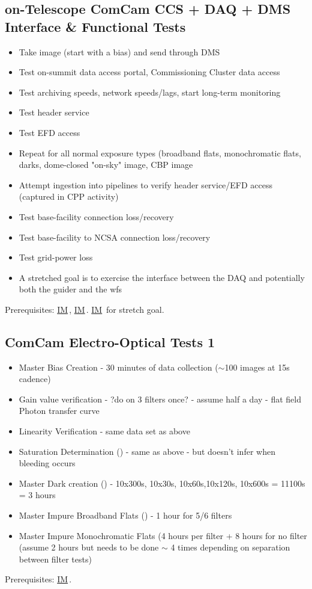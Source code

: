 \documentclass[SE,authoryear,toc]{lsstdoc}
\newcommand{\IM}[1]{\hyperref[IM:#1]{\color{blue}IM$_{\text{\csname nameIM#1\endcsname}}$}\gdef\thisIM{#1}}
\begin{document}
\subsection{on-Telescope ComCam CCS + DAQ + DMS Interface \& Functional Tests}
\begin{itemize}
\item Take image (start with a bias) and send through DMS
\item Test on-summit data access portal, Commissioning Cluster data access
\item Test archiving speeds, network speeds/lags, start long-term monitoring
\item Test header service
\item Test EFD access
\item Repeat for all normal exposure types (broadband flats, monochromatic flats, darks, dome-closed "on-sky" image, CBP image
\item Attempt ingestion into pipelines to verify header service/EFD access (captured in CPP activity)
\item Test base-facility connection loss/recovery
\item Test base-facility to NCSA connection loss/recovery
\item Test grid-power loss
\item A stretched goal is to exercise the interface between the DAQ and potentially both the guider and the wfs
\end{itemize}
Prerequisites: \IM{b}, \IM{cbp}.  \IM{g} for stretch goal.

\subsection{ComCam Electro-Optical Tests 1}

\begin{itemize}
\item Master Bias Creation - 30 minutes of data collection ($\sim$100 images at 15s cadence)
\item Gain value verification - ?do on 3 filters once? - assume half a day - flat field Photon transfer curve
\item Linearity Verification - same data set as above
\item Saturation Determination () - same as above - but doesn't infer when bleeding occurs
\item Master Dark creation () - 10x300s, 10x30s, 10x60s,10x120s, 10x600s = 11100s = 3 hours
\item Master Impure Broadband Flats () - 1 hour for 5/6 filters
\item Master Impure Monochromatic Flats (4 hours per filter + 8 hours for no filter (assume 2 hours but needs to be done $\sim$ 4 times depending on separation between filter tests)
\end{itemize}
Prerequisites: \IM{b}.
\end{document}
